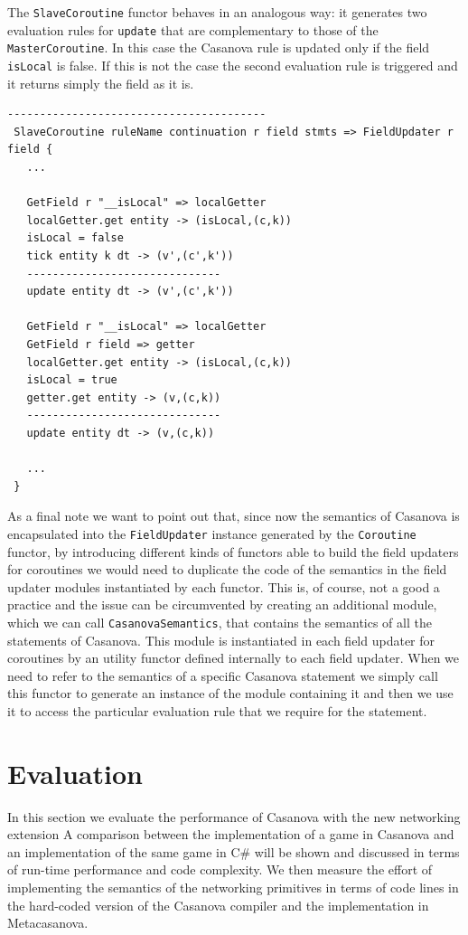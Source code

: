 \noindent
The \texttt{SlaveCoroutine} functor behaves in an analogous way: it generates two evaluation rules for \texttt{update} that are complementary to those of the \texttt{MasterCoroutine}. In this case the Casanova rule is updated only if the field \texttt{\tu\tu isLocal} is false. If this is not the case the second evaluation rule is triggered and it returns simply the field as it is.

\begin{lstlisting}
----------------------------------------
 SlaveCoroutine ruleName continuation r field stmts => FieldUpdater r field {
   ...

   GetField r "__isLocal" => localGetter
   localGetter.get entity -> (isLocal,(c,k))
   isLocal = false
   tick entity k dt -> (v',(c',k'))
   ------------------------------
   update entity dt -> (v',(c',k'))

   GetField r "__isLocal" => localGetter
   GetField r field => getter
   localGetter.get entity -> (isLocal,(c,k))
   isLocal = true
   getter.get entity -> (v,(c,k))
   ------------------------------
   update entity dt -> (v,(c,k))
   
   ... 
 }
\end{lstlisting}

\noindent
As a final note we want to point out that, since now the semantics of Casanova is encapsulated into the \texttt{FieldUpdater} instance generated by the \texttt{Coroutine} functor, by introducing different kinds of functors able to build the field updaters for coroutines we would need to duplicate the code of the semantics in the field updater modules instantiated by each functor. This is, of course, not a good a practice and the issue can be circumvented by creating an additional module, which we can call \texttt{CasanovaSemantics}, that contains the semantics of all the statements of Casanova. This module is instantiated in each field updater for coroutines by an utility functor defined internally to each field updater. When we need to refer to the semantics of a specific Casanova statement we simply call this functor to generate an instance of the module containing it and then we use it to access the particular evaluation rule that we require for the statement.

\section{Evaluation}
\label{sec:ch_networking_evaluation}
In this section we evaluate the performance of Casanova with the new networking extension A comparison between the implementation of a game in Casanova and an implementation of the same game in C\# will be shown and discussed in terms of run-time performance and code complexity. We then measure the effort of implementing the semantics of the networking primitives in terms of code lines in the hard-coded version of the Casanova compiler and the implementation in Metacasanova.

